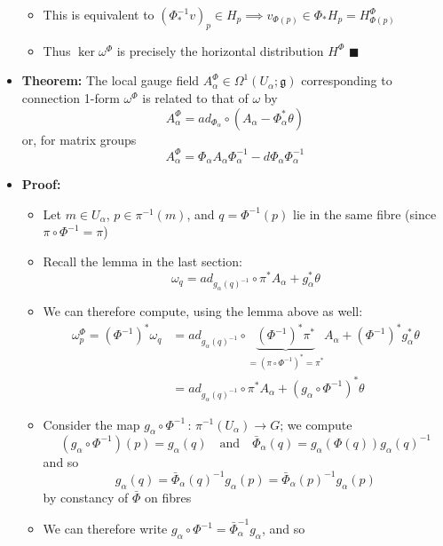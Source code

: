 \documentclass[12pt,a4paper]{article}
\numberwithin{equation}{section}
\begin{document}
\begin{itemize}
\begin{itemize}
			\item This is equivalent to $(\Phi^{-1}_{*}v)_{p}\in H_{p}\implies v_{\Phi(p)}\in\Phi_{*}H_{p}=H^{\Phi}_{\Phi(p)}$
			\item Thus $\ker{\omega^{\Phi}}$ is precisely the horizontal distribution $H^{\Phi}$ $\blacksquare$
		\end{itemize}
		\item \textbf{Theorem:} The local gauge field $A_{\alpha}^{\Phi}\in\Omega^{1}(U_{\alpha};\mathfrak{g})$ corresponding to connection 1-form $\omega^{\Phi}$ is related to that of $\omega$ by
		\begin{equation}
			A^{\Phi}_{\alpha}=ad_{\Phi_{\alpha}}\circ(A_{\alpha}-\Phi^{*}_{\alpha}\theta)
		\end{equation}
		or, for matrix groups
		\begin{equation}
			A^{\Phi}_{\alpha}=\Phi_{\alpha}A_{\alpha}\Phi^{-1}_{\alpha}-d\Phi_{\alpha}\Phi^{-1}_{\alpha}
		\end{equation}
		\item \textbf{Proof:}
		\begin{itemize}
			\item Let $m\in U_{\alpha}$, $p\in\pi^{-1}(m)$, and $q=\Phi^{-1}(p)$ lie in the same fibre (since $\pi\circ\Phi^{-1}=\pi$)
			\item Recall the lemma in the last section:
			$$
			\omega_{q}=ad_{g_{\alpha}(q)^{-1}}\circ\pi^{*}A_{\alpha}+g_{\alpha}^{*}\theta
			$$
			\item We can therefore compute, using the lemma above as well:
			$$
			\begin{aligned}
				\omega^{\Phi}_{p}=(\Phi^{-1})^{*}\omega_{q}&=ad_{g_{\alpha}(q)^{-1}}\circ\underbrace{(\Phi^{-1})^{*}\pi^{*}}_{=(\pi\circ\Phi^{-1})^{*}=\pi^{*}}A_{\alpha}+(\Phi^{-1})^{*}g_{\alpha}^{*}\theta\\&=ad_{g_{\alpha}(q)^{-1}}\circ\pi^{*}A_{\alpha}+(g_{\alpha}\circ\Phi^{-1})^{*}\theta
			\end{aligned}
			$$
			\item Consider the map $g_{\alpha}\circ \Phi^{-1}\,:\,\pi^{-1}(U_{\alpha})\to G$; we compute
			$$
			(g_{\alpha}\circ\Phi^{-1})(p)=g_{\alpha}(q)\quad\text{and}\quad\bar{\Phi}_{\alpha}(q)=g_{\alpha}(\Phi(q))g_{\alpha}(q)^{-1}
			$$
			and so
			$$
			g_{\alpha}(q)=\bar{\Phi}_{\alpha}(q)^{-1}g_{\alpha}(p)=\bar{\Phi}_{\alpha}(p)^{-1}g_{\alpha}(p)
			$$
			by constancy of $\bar{\Phi}$ on fibres
			\item We can therefore write $g_{\alpha}\circ\Phi^{-1}=\bar{\Phi}_{\alpha}^{-1}g_{\alpha}$, and so

\end{itemize}
\end{itemize}
\end{document}
